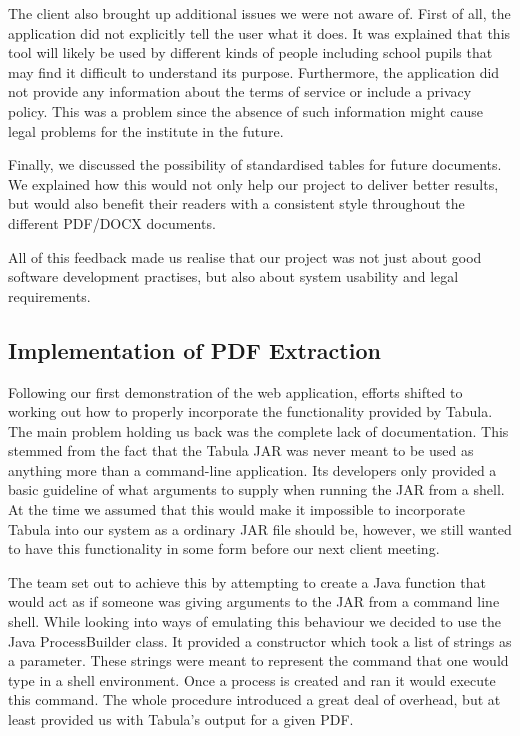 \documentclass{l3proj}
\begin{document}
The client also brought up additional issues we were not aware of. First of all, the application did not explicitly tell the user what it does. It was explained that this tool will likely be used by different kinds of people including school pupils that may find it difficult to understand its purpose. Furthermore, the application did not provide any information about the terms of service or include a privacy policy. This was a problem since the absence of such information might cause legal problems for the institute in the future.

Finally, we discussed the possibility of standardised tables for future documents. We explained how this would not only help our project to deliver better results, but would also benefit their readers with a consistent style throughout the different PDF/DOCX documents.

All of this feedback made us realise that our project was not just about good software development practises, but also about system usability and legal requirements.

\subsection{Implementation of PDF Extraction }
\label{sec:impl_pdf}
Following our first demonstration of the web application, efforts shifted to working out how to properly incorporate the functionality provided by Tabula. The main problem holding us back was the complete lack of documentation. This stemmed from the fact that the Tabula JAR was never meant to be used as anything more than a command-line application. Its developers only provided a basic guideline of what arguments to supply when running the JAR from a shell. At the time we assumed that this would make it impossible to incorporate Tabula into our system as a ordinary JAR file should be, however, we still wanted to have this functionality in some form before our next client meeting.

The team set out to achieve this by attempting to create a Java function that would act as if someone was giving arguments to the JAR from a command line shell. While looking into ways of emulating this behaviour we decided to use the Java ProcessBuilder class. It provided a constructor which took a list of strings as a parameter. These strings were meant to represent the command that one would type in a shell environment. Once a process is created and ran it would execute this command. The whole procedure introduced a great deal of overhead, but at least provided us with Tabula's output for a given PDF.
\end{document}
